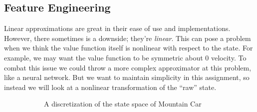 \documentclass[11pt,addpoints,answers]{exam}
\begin{document}
\subsection{Feature Engineering}
Linear approximations are great in their ease of use and implementations. However, there sometimes is a downside; they're \emph{linear}. This can pose a problem when we think the value function itself is nonlinear with respect to the state. For example, we may want the value function to be symmetric about 0 velocity. To combat this issue we could throw a more complex approximator at this problem, like a neural network. But we want to maintain simplicity in this assignment, so instead we will look at a nonlinear transformation of the ``raw'' state.

\begin{figure}[H]
\centering
\begin{subfigure}{0.5\textwidth}

\caption{A discretization of the state space of Mountain Car}
\label{fig:discrete}
\end{subfigure}%
\begin{subfigure}{0.5\textwidth}


\end{subfigure}
\end{figure}
\end{document}
